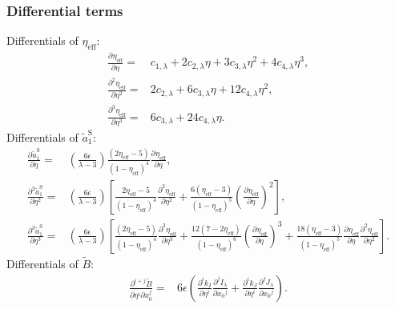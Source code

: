 \documentclass[english]{../thermomemo/thermomemo}
\newcommand*{\pd}[3][]{\frac{\partial^{#1}#2}{\partial{#3}^{#1}}}%
\newcommand*{\lb}{\left(}
\newcommand*{\rb}{\right)}
\newcommand{\aSt}{\ensuremath{\tilde{a}_{1}^{\text{S}}}\xspace}
\newcommand{\Bt}{\ensuremath{\tilde{B}}\xspace}
\newcommand{\eff}{\ensuremath{\text{eff}}\xspace}
\begin{document}
\subsubsection{Differential terms}
Differentials of $\eta_\eff$:
\begin{align}
  \label{eq:eta_eff_diff}
  \pd{\eta_\eff}{\eta} =& c_{1,\lambda} + 2 c_{2,\lambda} \eta + 3 c_{3,\lambda} \eta^2 + 4 c_{4,\lambda} \eta^3,\\
  \pd[2]{\eta_\eff}{\eta} =& 2 c_{2,\lambda} + 6 c_{3,\lambda} \eta + 12 c_{4,\lambda} \eta^2,\\
  \pd[3]{\eta_\eff}{\eta} =& 6 c_{3,\lambda} + 24 c_{4,\lambda} \eta.
\end{align}
Differentials of $\aSt$:
\begin{align}
  \label{eq:a1St_diff}
  \pd{\aSt}{\eta} =& \lb \frac{6 \epsilon}{\lambda - 3} \rb \frac{\lb 2\eta_\eff-5\rb}{\lb 1 - \eta_\eff \rb^4}\pd{\eta_\eff}{\eta},\\
  \pd[2]{\aSt}{\eta} =& \lb \frac{6\epsilon}{\lambda - 3} \rb \left[ \frac{2\eta_\eff - 5}{\lb 1 - \eta_\eff \rb^4}\pd[2]{\eta_\eff}{\eta} + \frac{6\lb\eta_\eff - 3\rb}{\lb 1 - \eta_\eff \rb^5} \lb \pd{\eta_\eff}{\eta} \rb^2 \right],\\
    \pd[3]{\aSt}{\eta} =& \lb \frac{6 \epsilon}{\lambda - 3} \rb \left[\frac{\lb 2\eta_\eff - 5 \rb}{\lb 1 - \eta_\eff \rb^4}\pd[3]{\eta_\eff}{\eta} + \frac{12\lb 7 - 2\eta_\eff\rb}{\lb 1 - \eta_\eff \rb^6} \lb \pd{\eta_\eff}{\eta} \rb^3 + \frac{18\lb \eta_\eff - 3 \rb}{\lb 1 - \eta_\eff \rb^5} \pd{\eta_\eff}{\eta} \pd[2]{\eta_\eff}{\eta}\right].
\end{align}
Differentials of $\Bt$:
\begin{align}
  \label{eq:B_diff}
  \frac{\partial^{i+j}\Bt}{\partial \eta^i \partial x_0^j} =& 6 \epsilon \lb \pd[i]{k_I}{\eta}\pd[j]{I_\lambda}{x_0} + \pd[i]{k_J}{\eta}\pd[j]{J_\lambda}{x_0} \rb.
\end{align}
\end{document}
